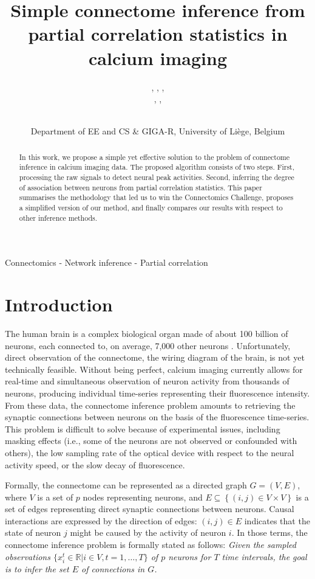 \documentclass[wcp]{jmlr}
\title{Simple connectome inference from partial correlation statistics in calcium imaging}
\author{\Name{Antonio Sutera},
   \Name{Arnaud Joly},
   \Name{Vincent François-Lavet}, \Email{a.sutera@ulg.ac.be}\\
   \Name{Zixiao Aaron Qiu},
   \Name{Gilles Louppe},
   \Name{Damien Ernst}\and\Name{Pierre Geurts}
    \\
   \addr Department of EE and CS \& GIGA-R, University of Li\`ege, Belgium}
\begin{document}
\maketitle

\vspace{-1cm}
\begin{abstract}
In this work, we propose a simple yet effective solution to the problem of
connectome inference in calcium imaging data. The proposed algorithm consists of
two steps. First, processing the raw signals to detect neural peak activities.
Second, inferring the degree of association between neurons from partial
correlation statistics. This paper summarises the methodology that led us to
win the Connectomics Challenge, proposes a simplified version of our method, and
finally compares our results with respect to other inference methods.
\end{abstract}


\begin{keywords}
Connectomics - Network inference - Partial correlation
\end{keywords}


\section{Introduction}\label{sec:intro}

The human brain is a complex biological organ made of about 100 billion of
neurons, each connected to, on average, 7,000 other neurons
\citep{pakkenberg2003aging}. Unfortunately, direct observation of the
connectome, the wiring diagram of the brain, is not yet technically feasible.
Without being perfect, calcium imaging currently allows for real-time and
simultaneous observation of neuron activity from thousands of neurons,
producing individual time-series representing their fluorescence intensity.
From these data, the connectome inference problem amounts to retrieving the
synaptic connections between neurons on the basis of the fluorescence time-series. This problem is difficult to solve because of experimental issues,
including masking effects (i.e., some of the neurons are not observed or
confounded with others), the low sampling rate of the optical device with
respect to the neural activity speed, or the slow decay of fluorescence.

Formally, the connectome can be represented as a directed graph $G=(V,E)$,
where $V$ is a set of $p$ nodes representing neurons, and $E \subseteq
\left\{(i, j) \in V \times V\right\}$ is a set of edges representing direct
synaptic connections between neurons. Causal interactions are expressed by the
direction of edges: $(i, j) \in E$ indicates that the state of neuron $j$ might
be caused by the activity of neuron $i$. In those terms,  the connectome
inference problem is formally stated as follows:  \textit{Given the sampled
observations $\{ x^t_i \in \mathbb{R} | i \in V, t = 1, \dots, T \}$ of $p$
neurons for $T$ time intervals, the goal is to infer the set $E$ of connections
in $G$.}
\end{document}
